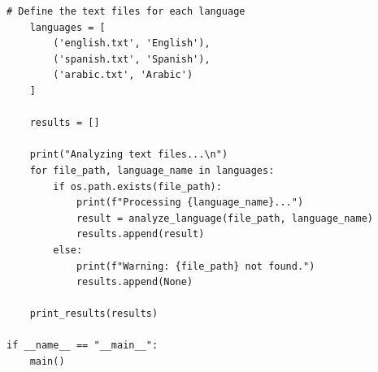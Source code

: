 \documentclass[12pt]{article}
\begin{document}
\begin{lstlisting}[caption={main.py - Language Complexity Analysis Tool}]
    # Define the text files for each language
    languages = [
        ('english.txt', 'English'),
        ('spanish.txt', 'Spanish'),
        ('arabic.txt', 'Arabic')
    ]
    
    results = []
    
    print("Analyzing text files...\n")
    for file_path, language_name in languages:
        if os.path.exists(file_path):
            print(f"Processing {language_name}...")
            result = analyze_language(file_path, language_name)
            results.append(result)
        else:
            print(f"Warning: {file_path} not found.")
            results.append(None)
    
    print_results(results)

if __name__ == "__main__":
    main()
\end{lstlisting}
\end{document}
